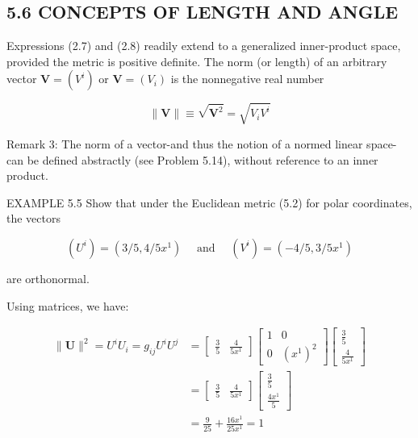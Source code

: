 \documentclass[10pt]{article}
\begin{document}
\subsection*{5.6 CONCEPTS OF LENGTH AND ANGLE}
Expressions (2.7) and (2.8) readily extend to a generalized inner-product space, provided the metric is positive definite. The norm (or length) of an arbitrary vector $\mathbf{V}=\left(V^{i}\right)$ or $\mathbf{V}=\left(V_{i}\right)$ is the nonnegative real number


\begin{equation*}
\|\mathbf{V}\| \equiv \sqrt{\mathbf{V}^{2}}=\sqrt{V_{i} V^{i}} \tag{5.10}
\end{equation*}


Remark 3: The norm of a vector-and thus the notion of a normed linear space-can be defined abstractly (see Problem 5.14), without reference to an inner product.

EXAMPLE 5.5 Show that under the Euclidean metric (5.2) for polar coordinates, the vectors

$$
\left(U^{i}\right)=\left(3 / 5,4 / 5 x^{1}\right) \quad \text { and } \quad\left(V^{i}\right)=\left(-4 / 5,3 / 5 x^{1}\right)
$$

are orthonormal.

Using matrices, we have:

$$
\begin{aligned}
\|\mathbf{U}\|^{2}=U^{i} U_{i}=g_{i j} U^{i} U^{j} & =\left[\begin{array}{ll}
\frac{3}{5} & \frac{4}{5 x^{1}}
\end{array}\right]\left[\begin{array}{cc}
1 & 0 \\
0 & \left(x^{1}\right)^{2}
\end{array}\right]\left[\begin{array}{c}
\frac{3}{5} \\
\frac{4}{5 x^{1}}
\end{array}\right] \\
& =\left[\begin{array}{ll}
\frac{3}{5} & \frac{4}{5 x^{1}}
\end{array}\right]\left[\begin{array}{c}
\frac{3}{5} \\
\frac{4 x^{1}}{5}
\end{array}\right] \\
& =\frac{9}{25}+\frac{16 x^{1}}{25 x^{1}}=1
\end{aligned}
$$
\end{document}
